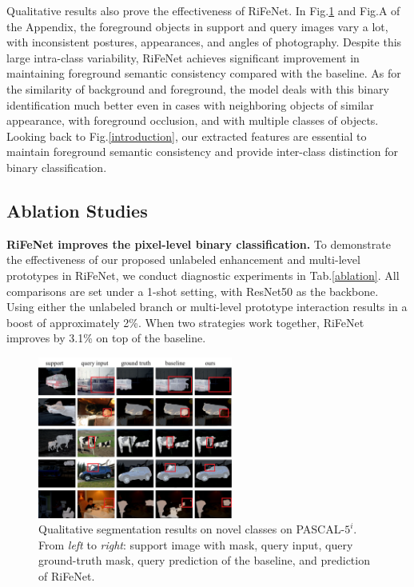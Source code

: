 \documentclass[letterpaper]{article} %
\begin{document}
Qualitative results also prove the effectiveness of RiFeNet. In Fig.\ref{segresult} and Fig.A of the Appendix, the foreground objects in support and query images vary a lot, with inconsistent postures, appearances, and angles of photography. Despite this large intra-class variability, RiFeNet achieves significant improvement in maintaining foreground semantic consistency compared with the baseline. As for the similarity of background and foreground, the model deals with this binary identification much better even in cases with neighboring objects of similar appearance, with foreground occlusion, and with multiple classes of objects. Looking back to Fig.\ref{introduction}, our extracted features are essential to maintain foreground semantic consistency and provide inter-class distinction for binary classification.

\subsection{Ablation Studies}

\textbf{RiFeNet improves the pixel-level binary classification.}
To demonstrate the effectiveness of our proposed unlabeled enhancement and multi-level prototypes in RiFeNet, we conduct diagnostic experiments in Tab.\ref{ablation}. All comparisons are set under a 1-shot setting, with ResNet50 as the backbone. Using either the unlabeled branch or multi-level prototype interaction results in a boost of approximately 2\%. When two strategies work together, RiFeNet improves by 3.1\% on top of the baseline.
\begin{figure}[!t]
\centering
\includegraphics[width=0.76\linewidth,height=2.09in ]{vis.pdf}
\caption{Qualitative segmentation results on novel classes on PASCAL-$5^i$. From \textit{left} to \textit{right}: support image with mask, query input, query ground-truth mask, query prediction of the baseline, and prediction of RiFeNet.}
\label{segresult}
\end{figure}
\end{document}

